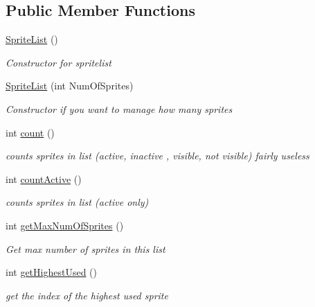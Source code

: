 \subsection*{Public Member Functions}
\begin{DoxyCompactItemize}
\item 
\mbox{\hyperlink{class_r_c___framework_1_1_sprite_list_aa12cce855c8cfefbfb9dd4f011ee6b0c}{Sprite\+List}} ()
\begin{DoxyCompactList}\small\item\em Constructor for spritelist \end{DoxyCompactList}\item 
\mbox{\hyperlink{class_r_c___framework_1_1_sprite_list_ab960d5ea8bbf16fe40562fc083ce8059}{Sprite\+List}} (int Num\+Of\+Sprites)
\begin{DoxyCompactList}\small\item\em Constructor if you want to manage how many sprites \end{DoxyCompactList}\item 
int \mbox{\hyperlink{class_r_c___framework_1_1_sprite_list_a5ae9a1c4902704af27642541288eab22}{count}} ()
\begin{DoxyCompactList}\small\item\em counts sprites in list (active, inactive , visible, not visible) fairly useless \end{DoxyCompactList}\item 
int \mbox{\hyperlink{class_r_c___framework_1_1_sprite_list_a806056c18832f13d2adf0dad0c0b2152}{count\+Active}} ()
\begin{DoxyCompactList}\small\item\em counts sprites in list (active only) \end{DoxyCompactList}\item 
int \mbox{\hyperlink{class_r_c___framework_1_1_sprite_list_a093cf170b2802f89be43bf86ed81662e}{get\+Max\+Num\+Of\+Sprites}} ()
\begin{DoxyCompactList}\small\item\em Get max number of sprites in this list \end{DoxyCompactList}\item 
int \mbox{\hyperlink{class_r_c___framework_1_1_sprite_list_aad3ba75650382840c4c11d28022bc288}{get\+Highest\+Used}} ()
\begin{DoxyCompactList}\small\item\em get the index of the highest used sprite \end{DoxyCompactList}\item 

\end{DoxyCompactItemize}
